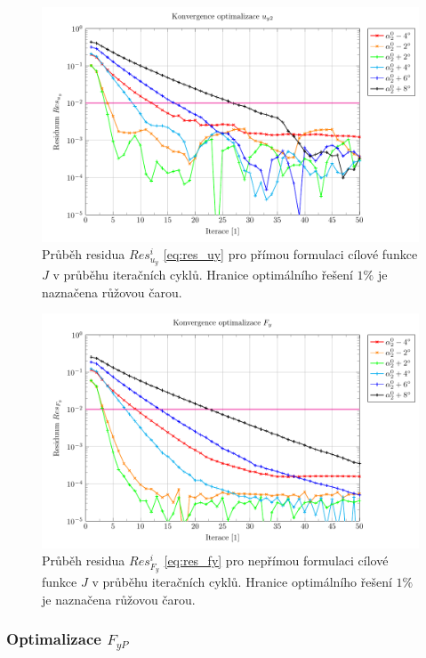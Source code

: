 \begin{figure}[H]
	\includegraphics[width=1.0\columnwidth]{img/Uy.pdf}
	\caption[Průběh residua $ Res_{u_y}^i $]{Průběh residua $ Res_{u_y}^i $ \ref{eq:res_uy} pro přímou formulaci cílové funkce $ J $ v průběhu iteračních cyklů. Hranice optimálního řešení $ 1\% $ je naznačena růžovou čarou.}
	\label{fig:ghs1_Uy}
\end{figure}

\begin{figure}[H]
	\includegraphics[width=1.0\columnwidth]{img/Fy.pdf}
	\caption[Průběh residua $ Res_{F_y}^i $]{Průběh residua $ Res_{F_y}^i $ \ref{eq:res_fy} pro nepřímou formulaci cílové funkce $ J $ v průběhu iteračních cyklů. Hranice optimálního řešení $ 1\% $ je naznačena růžovou čarou.}
	\label{fig:ghs1_Fy}
\end{figure}

\subsubsection{Optimalizace $ F_{yP} $}

